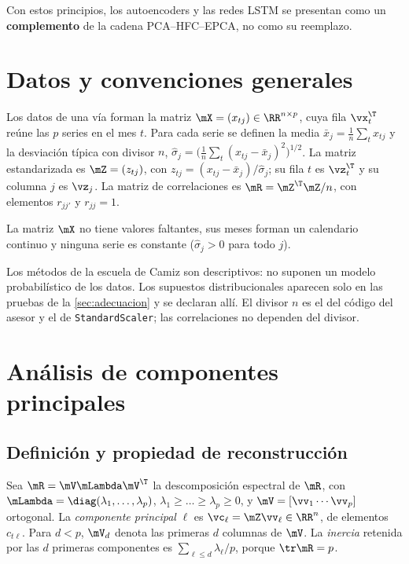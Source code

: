 Con estos principios, los autoencoders y las redes LSTM se presentan como un
\textbf{complemento} de la cadena PCA--HFC--EPCA, no como su reemplazo.

\section{Datos y convenciones generales}
\label{sec:datos}

\begin{definicion}\label{def:datos}
Los datos de una vía forman la matriz $\mX=(x_{tj})\in\RR^{n\times p}$, cuya fila
$\vx_t^{\T}$ reúne las $p$ series en el mes $t$. Para cada serie se definen la media
$\bar x_j=\frac1n\sum_{t}x_{tj}$ y la desviación típica con divisor $n$,
$\hat\sigma_j=\bigl(\frac1n\sum_t(x_{tj}-\bar x_j)^2\bigr)^{1/2}$. La matriz estandarizada es
$\mZ=(z_{tj})$, con $z_{tj}=(x_{tj}-\bar x_j)/\hat\sigma_j$; su fila $t$ es $\vz_t^{\T}$ y su
columna $j$ es $\vz_j$. La matriz de correlaciones es $\mR=\mZ^{\T}\mZ/n$, con elementos
$r_{jj'}$ y $r_{jj}=1$.
\end{definicion}

\begin{supuesto}\label{sup:datos}
La matriz $\mX$ no tiene valores faltantes, sus meses forman un calendario continuo y ninguna
serie es constante ($\hat\sigma_j>0$ para todo $j$).
\end{supuesto}

Los métodos de la escuela de Camiz son descriptivos: no suponen un modelo probabilístico de los
datos. Los supuestos distribucionales aparecen solo en las pruebas de la
\cref{sec:adecuacion} y se declaran allí. El divisor $n$ es el del código del asesor y el de
\texttt{StandardScaler}; las correlaciones no dependen del divisor.

\section{Análisis de componentes principales}
\label{sec:pca}

\subsection{Definición y propiedad de reconstrucción}

\begin{definicion}\label{def:pca}
Sea $\mR=\mV\mLambda\mV^{\T}$ la descomposición espectral de $\mR$, con
$\mLambda=\diag(\lambda_1,\dots,\lambda_p)$, $\lambda_1\ge\dots\ge\lambda_p\ge0$, y
$\mV=[\vv_1\cdots\vv_p]$ ortogonal. La \emph{componente principal} $\ell$ es
$\vc_\ell=\mZ\vv_\ell\in\RR^{n}$, de elementos $c_{t\ell}$. Para $d<p$, $\mV_d$ denota las
primeras $d$ columnas de $\mV$. La \emph{inercia} retenida por las $d$ primeras componentes es
$\sum_{\ell\le d}\lambda_\ell/p$, porque $\tr\mR=p$.
\end{definicion}

